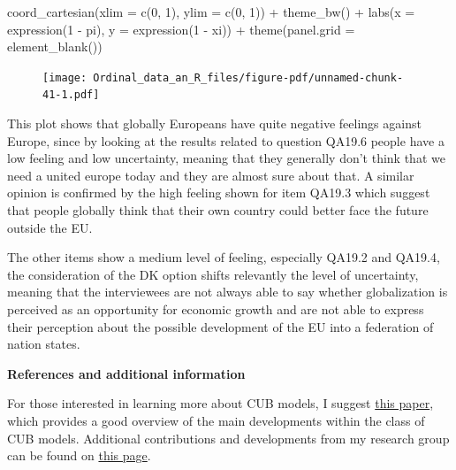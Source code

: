 \documentclass[
  letterpaper,
  DIV=11,
  numbers=noendperiod]{scrartcl}
\newenvironment{Shaded}{\begin{snugshade}}{\end{snugshade}}
\newcommand{\AttributeTok}[1]{\textcolor[rgb]{0.40,0.45,0.13}{#1}}
\newcommand{\DecValTok}[1]{\textcolor[rgb]{0.68,0.00,0.00}{#1}}
\newcommand{\FunctionTok}[1]{\textcolor[rgb]{0.28,0.35,0.67}{#1}}
\newcommand{\NormalTok}[1]{\textcolor[rgb]{0.00,0.23,0.31}{#1}}
\newcommand{\SpecialCharTok}[1]{\textcolor[rgb]{0.37,0.37,0.37}{#1}}
\begin{document}
\begin{Shaded}
\begin{Highlighting}[]
  \FunctionTok{coord\_cartesian}\NormalTok{(}\AttributeTok{xlim =} \FunctionTok{c}\NormalTok{(}\DecValTok{0}\NormalTok{, }\DecValTok{1}\NormalTok{), }\AttributeTok{ylim =} \FunctionTok{c}\NormalTok{(}\DecValTok{0}\NormalTok{, }\DecValTok{1}\NormalTok{)) }\SpecialCharTok{+}
  \FunctionTok{theme\_bw}\NormalTok{() }\SpecialCharTok{+}
  \FunctionTok{labs}\NormalTok{(}\AttributeTok{x =} \FunctionTok{expression}\NormalTok{(}\DecValTok{1} \SpecialCharTok{{-}}\NormalTok{ pi), }\AttributeTok{y =} \FunctionTok{expression}\NormalTok{(}\DecValTok{1} \SpecialCharTok{{-}}\NormalTok{ xi)) }\SpecialCharTok{+}
  \FunctionTok{theme}\NormalTok{(}\AttributeTok{panel.grid =} \FunctionTok{element\_blank}\NormalTok{())}
\end{Highlighting}
\end{Shaded}

\begin{figure}[H]

{\centering \texttt{[image: Ordinal\_data\_an\_R\_files/figure-pdf/unnamed-chunk-41-1.pdf]}

}

\end{figure}

This plot shows that globally Europeans have quite negative feelings
against Europe, since by looking at the results related to question
QA19.6 people have a low feeling and low uncertainty, meaning that they
generally don't think that we need a united europe today and they are
almost sure about that. A similar opinion is confirmed by the high
feeling shown for item QA19.3 which suggest that people globally think
that their own country could better face the future outside the EU.

The other items show a medium level of feeling, especially QA19.2 and
QA19.4, the consideration of the DK option shifts relevantly the level
of uncertainty, meaning that the interviewees are not always able to say
whether globalization is perceived as an opportunity for economic growth
and are not able to express their perception about the possible
development of the EU into a federation of nation states.

\textbf{References and additional information}

For those interested in learning more about CUB models, I suggest
\href{https://link.springer.com/article/10.1007/s10260-019-00461-1}{this
paper}, which provides a good overview of the main developments within
the class of CUB models. Additional contributions and developments from
my research group can be found on
\href{https://bodai.unibs.it/cub/}{this page}.
\end{document}
